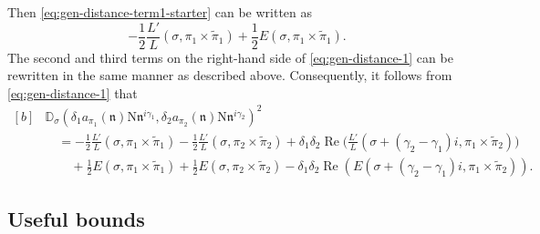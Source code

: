 \documentclass[12pt,reqno]{amsart}
\renewcommand{\tilde}{\widetilde}
\theoremstyle{remark}
\renewcommand{\tilde}{\widetilde}
\DeclareMathOperator{\Real}{Re}
\renewcommand{\tilde}{\widetilde}
\newcommand{\N}{\mathrm{N}}
\newcommand{\kn}{\mathfrak{n}}
\numberwithin{equation}{section}
\begin{document}
        Then \eqref{eq:gen-distance-term1-starter} can be written as
	\begin{equation*}
		 -\frac{1}{2}\frac{L'}{L}(\sigma, \pi_1 \times \tilde{\pi}_1) +   
		\frac{1}{2} E(\sigma, \pi_1 \times \widetilde{\pi}_1) .
	\end{equation*}
   The second and third terms on the right-hand side of \eqref{eq:gen-distance-1} can be rewritten in the same manner as described above. Consequently, it follows from \eqref{eq:gen-distance-1} that
    	\begin{equation}
		\label{eq:gen-distance-3}
		\begin{aligned}[b]
			&\mathbb{D}_{\sigma}(\delta_1 a_{\pi_1}(\kn)\N\kn^{i\gamma_1},\delta_2 a_{\pi_2}(\kn)\N\kn^{i\gamma_2})^2 \\
			&\quad = -\frac{1}{2}\frac{L'}{L}(\sigma, \pi_1 \times \tilde{\pi}_1)-\frac{1}{2} \frac{L'}{L}(\sigma, \pi_2 \times \tilde{\pi}_2)   +   \delta_1\delta_2\Real\Big(\frac{L'}{L}(\sigma + (\gamma_2-\gamma_1)i, \pi_1 \times \tilde{\pi}_2) \Big)\\
			&\qquad +
			\frac{1}{2}E(\sigma, \pi_1 \times \tilde{\pi}_1) +  \frac{1}{2}E(\sigma, \pi_2 \times \tilde{\pi}_2) -\delta_1\delta_2 \Real(E(\sigma+(\gamma_2-\gamma_1)i, \pi_1 \times \tilde{\pi}_2)).
		\end{aligned}
	\end{equation}



	\subsection{Useful bounds} 
	
\end{document}
